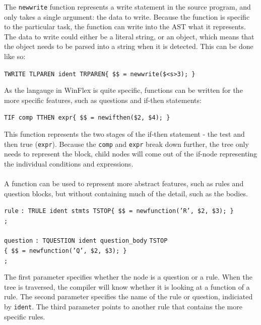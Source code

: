 \documentclass[12pt]{report}
\begin{document}
The \texttt{newwrite} function represents a write statement in the source program, and only takes a single argument: the data to write.  Because the function is specific to the particular task, the function can write into the AST what it represents.  The data to write could either be a literal string, or an object, which means that the object needs to be parsed into a string when it is detected.  This can be done like so:\\
\begin{center}
	\texttt{TWRITE TLPAREN ident TRPAREN\quad\quad\{ \$\$ = newwrite(\$<s>3); \}}
\end{center}
As the langauge in WinFlex is quite specific, functions can be written for the more specific features, such as questions and if-then statements:\\
\begin{center}
	\texttt{TIF comp TTHEN expr\quad\quad\quad\{ \$\$ = newifthen(\$2, \$4); \}}
\end{center}
This function represents the two stages of the if-then statement - the test and then true (\texttt{expr}).  Because the \texttt{comp} and \texttt{expr} break down further, the tree only needs to represent the block, child nodes will come out of the if-node representing the individual conditions and expressions.\\
\\
A function can be used to represent more abstract features, such as rules and question blocks, but without containing much of the detail, such as the bodies.
\clearpage
\begin{tabbing}
	\texttt{rule} \= \texttt{: TRULE ident stmts TSTOP\quad\quad\quad\{ \$\$ = newfunction('R', \$2, \$3); \}}\\
	\> \texttt{;}\\
	\\
	\texttt{question} \= \texttt{: TQUESTION ident question\_body} \= \texttt{TSTOP}\\
	\> \> \texttt{\{ \$\$ = newfunction('Q', \$2, \$3); \}}\\
	\> \texttt{;}\\
\end{tabbing}
The first parameter specifies whether the node is a question or a rule.  When the tree is traversed, the compiler will know whether it is looking at a function of a rule.  The second parameter specifies the name of the rule or question, indiciated by \texttt{ident}.  The third parameter points to another rule that contains the more specific rules.\\
\end{document}
